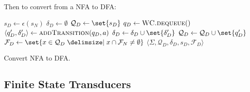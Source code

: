 \begin{definition}
    Then to convert from a NFA to DFA:
    \begin{algorithm}[H]
        \begin{algorithmic}[1]
                \State $s_D \gets \epsilon(s_N)$
                \State $\delta_D \gets \emptyset$
                \State $\mathcal{Q}_D \gets \set{s_D}$
                \State {} 
                    \State $q_D \gets \Call{WC.dequeue}{\null}$
                        \State $\langle q_D^\prime, \delta_D^\prime \rangle \gets \Call{addTransition}{q_D, a}$
                        \State $\delta_D \gets \delta_D \cup \set{\delta_D^\prime}$
                            \State {}
                        \EndIf
                        \State $\mathcal{Q}_D \gets \mathcal{Q}_D \cup \set{q_D^\prime}$
                    \EndFor
                \EndWhile
                \State $\mathcal{F}_D \gets \set{x \in \mathcal{Q}_D \given x \cap \mathcal{F}_N \ne \emptyset}$
                \State \Return $\langle
                    \Sigma,
                    \mathcal{Q}_D,
                    \delta_D,
                    s_D,
                    \mathcal{F}_D
                \rangle$
            \EndProcedure
        \end{algorithmic}
        \caption{Convert NFA to DFA.}
        \label{algo:nfa-to-dfa}
    \end{algorithm}
\end{definition}

\subsection{Finite State Transducers}

